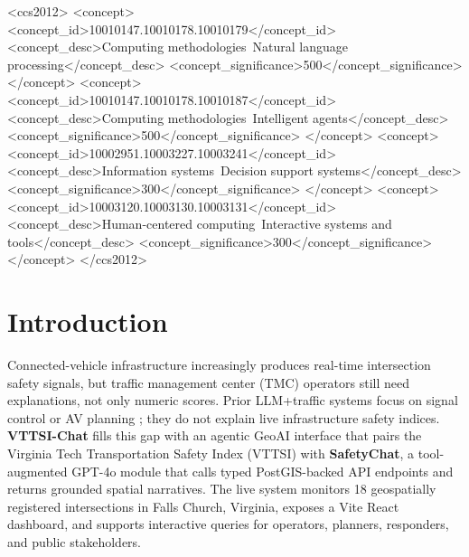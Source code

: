 \documentclass[sigconf]{acmart}
\begin{document}
\begin{CCSXML}
<ccs2012>
 <concept>
  <concept_id>10010147.10010178.10010179</concept_id>
  <concept_desc>Computing methodologies~Natural language processing</concept_desc>
  <concept_significance>500</concept_significance>
 </concept>
 <concept>
  <concept_id>10010147.10010178.10010187</concept_id>
  <concept_desc>Computing methodologies~Intelligent agents</concept_desc>
  <concept_significance>500</concept_significance>
 </concept>
 <concept>
  <concept_id>10002951.10003227.10003241</concept_id>
  <concept_desc>Information systems~Decision support systems</concept_desc>
  <concept_significance>300</concept_significance>
 </concept>
 <concept>
  <concept_id>10003120.10003130.10003131</concept_id>
  <concept_desc>Human-centered computing~Interactive systems and tools</concept_desc>
  <concept_significance>300</concept_significance>
 </concept>
</ccs2012>
\end{CCSXML}



\maketitle

\section{Introduction}
\label{sec:intro}

Connected-vehicle infrastructure increasingly produces real-time
intersection safety signals, but traffic management center (TMC) operators
still need explanations, not only numeric scores.
Prior LLM+traffic systems focus on signal control \cite{llmlight2024} or
AV planning \cite{gptdriver2023,drivevlm2024}; they do not explain live
infrastructure safety indices.
\textbf{VTTSI-Chat} fills this gap with an agentic GeoAI interface that
pairs the Virginia Tech Transportation Safety Index (VTTSI) with
\textbf{SafetyChat}, a tool-augmented GPT-4o module that calls typed
PostGIS-backed API endpoints and returns grounded spatial narratives.
The live system monitors 18 geospatially registered intersections in Falls
Church, Virginia, exposes a Vite React dashboard, and supports interactive
queries for operators, planners, responders, and public stakeholders.
\end{document}
